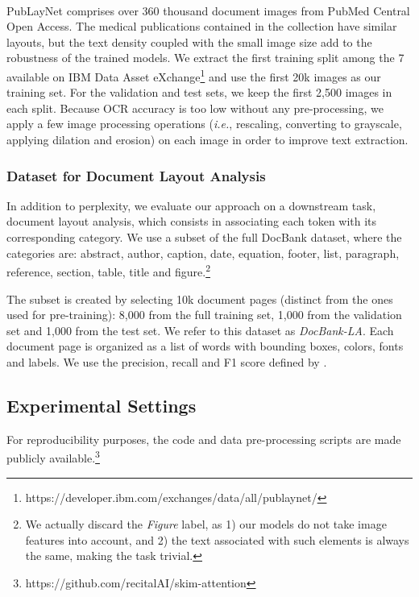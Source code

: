 PubLayNet comprises over 360 thousand document images from PubMed Central\textsuperscript{\texttrademark} Open Access. The medical publications contained in the collection have similar layouts, but the text density coupled with the small image size add to the robustness of the trained models. We extract the first training split among the 7 available on IBM Data Asset eXchange\footnote{https://developer.ibm.com/exchanges/data/all/publaynet/} and use the first 20k images as our training set. For the validation and test sets, we keep the first 2,500 images in each split. Because OCR accuracy is too low without any pre-processing, we apply a few image processing operations (\textit{i.e.}, rescaling, converting to grayscale, applying dilation and erosion) on each image in order to improve text extraction.

\subsubsection{Dataset for Document Layout Analysis}

In addition to perplexity, we evaluate our approach on a downstream task, document layout analysis, which consists in associating each token with its corresponding category. We use a subset of the full DocBank dataset, where the categories are: abstract, author, caption, date, equation, footer, list, paragraph, reference, section, table, title and figure.\footnote{We actually discard the \textit{Figure} label, as 1) our models do not take image features into account, and 2) the text associated with such elements is always the same, making the task trivial.}

The subset is created by selecting 10k document pages (distinct from the ones used for pre-training): 8,000 from the full training set, 1,000 from the validation set and 1,000 from the test set. We refer to this dataset as \textit{DocBank-LA}. Each document page is organized as a list of words with bounding boxes, colors, fonts and labels. We use the precision, recall and F1 score defined by \citet{li2020docbank}.

\subsection{Experimental Settings}

For reproducibility purposes, the code and data pre-processing scripts are made publicly available.\footnote{https://github.com/recitalAI/skim-attention}

